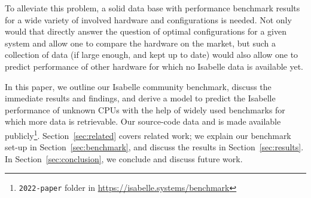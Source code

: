 To alleviate this problem,
a solid data base with performance benchmark results
for a wide variety of involved hardware and configurations
is needed.
Not only would that directly answer the question of optimal configurations for a given system
and allow one to compare the hardware on the market,
but such a collection of data
(if large enough, and kept up to date)
would also allow one to predict performance of other hardware for which no Isabelle data is available yet.

In this paper,
we outline our Isabelle community benchmark,
discuss the immediate results and findings,
and derive a model to predict the Isabelle performance of unknown CPUs
with the help of widely used benchmarks for which more data is retrievable.
Our source-code data and is made available publicly\footnote{\texttt{2022-paper} folder in \url{https://isabelle.systems/benchmark}}.
Section~\ref{sec:related} covers related work;
we explain our benchmark set-up in Section~\ref{sec:benchmark},
and discuss the results in Section~\ref{sec:results}.
In Section~\ref{sec:conclusion},
we conclude and discuss future work.
